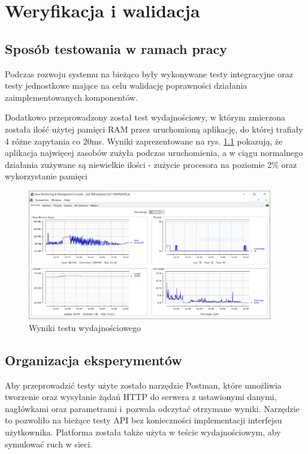 \chapter{Weryfikacja i walidacja}
\label{ch:06}
\section{Sposób testowania w ramach pracy}
Podczas rozwoju systemu na bieżąco były wykonywane testy integracyjne oraz testy jednostkowe mające na celu walidację poprawności działania zaimplementowanych komponentów. 

Dodatkowo przeprowadzony został test wydajnościowy, w którym zmierzona została ilość użytej pamięci RAM przez uruchomioną aplikację, do której trafiały 4 różne zapytania co 20ms. Wyniki zaprezentowane na rys. \ref{fig:performance} pokazują, że aplikacja najwięcej zasobów zużyła podczas uruchomienia, a w ciągu normalnego działania zużywane są niewielkie ilości - zużycie procesora na poziomie 2\% oraz wykorzystanie pamięci 
\begin{figure}[h]
\centering
\includegraphics[width=0.95\textwidth]{./graf/performance.PNG}
\caption{Wyniki testu wydajnościowego}
\label{fig:performance}
\end{figure}

\section{Organizacja eksperymentów}
Aby przeprowadzić testy użyte zostało narzędzie Postman, które umożliwia tworzenie oraz wysyłanie żądań HTTP do serwera z ustawionymi danymi, nagłówkami oraz parametrami i~pozwala odczytać otrzymane wyniki. Narzędzie to pozwoliło na bieżące testy API bez konieczności implementacji interfejsu użytkownika. Platforma została także użyta w teście wydajnościowym, aby symulować ruch w sieci.

